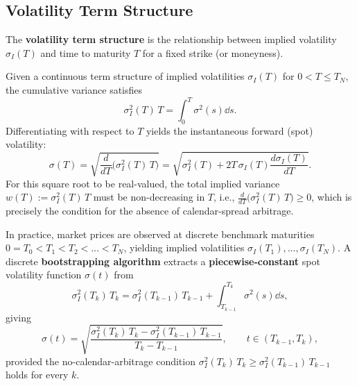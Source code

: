 \subsection{Volatility Term Structure}
\begin{definition}
    \label{def:ch05-term-structure}
    The \textbf{volatility term structure} is the relationship between implied volatility $\sigma_I(T)$ and time to maturity $T$ for a fixed strike (or moneyness).
\end{definition}

Given a continuous term structure of implied volatilities $\sigma_I(T)$ for $0 < T \le T_N$, the cumulative variance satisfies
\[
    \sigma_I^2(T)\,T = \int_0^T \sigma^2(s)\dd s.
\]
Differentiating with respect to $T$ yields the instantaneous forward (spot) volatility:
\[
    \sigma(T) = \sqrt{\frac{d}{dT}\bigl(\sigma_I^2(T)\,T\bigr)}
    = \sqrt{\sigma_I^2(T) + 2T\,\sigma_I(T)\frac{d\sigma_I(T)}{dT}}.
\]
For this square root to be real-valued, the total implied variance $w(T) := \sigma_I^2(T)\,T$ must be non-decreasing in $T$, i.e., $\frac{d}{dT}\bigl(\sigma_I^2(T)\,T\bigr) \ge 0$, which is precisely the condition for the absence of calendar-spread arbitrage.

In practice, market prices are observed at discrete benchmark maturities $0 = T_0 < T_1 < T_2 < \dots < T_N$, yielding implied volatilities $\sigma_I(T_1), \dots, \sigma_I(T_N)$. A discrete \textbf{bootstrapping algorithm} extracts a \textbf{piecewise-constant} spot volatility function $\sigma(t)$ from
\[
    \sigma_I^2(T_k)\,T_k = \sigma_I^2(T_{k-1})\,T_{k-1} + \int_{T_{k-1}}^{T_k} \sigma^2(s)\dd s,
\]
giving
\[
    \sigma(t) = \sqrt{\frac{\sigma_I^2(T_k)\,T_k - \sigma_I^2(T_{k-1})\,T_{k-1}}{T_k - T_{k-1}}}, \qquad t \in (T_{k-1}, T_k),
\]
provided the no-calendar-arbitrage condition $\sigma_I^2(T_k)\,T_k \ge \sigma_I^2(T_{k-1})\,T_{k-1}$ holds for every $k$.

